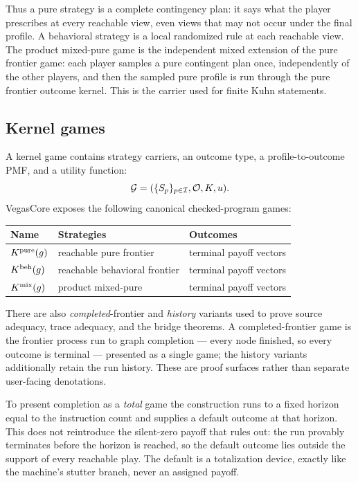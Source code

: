 Thus a pure strategy is a complete contingency plan: it says what the
player prescribes at every reachable view, even views that may not occur
under the final profile.  A behavioral strategy is a local randomized
rule at each reachable view.  The product mixed-pure game is the
independent mixed extension of the pure frontier game: each player
samples a pure contingent plan once, independently of the other players,
and then the sampled pure profile is run through the pure frontier
outcome kernel.  This is the carrier used for finite Kuhn statements.

\subsection{Kernel games}
\label{sec:fosg-kernel-games}

A kernel game contains strategy carriers, an outcome type, a
profile-to-outcome PMF, and a utility function:
\[
  \mathcal{G} = (\{S_p\}_{p\in\mathcal{I}}, \mathcal{O}, K, u).
\]
VegasCore exposes the following canonical checked-program games:
\begin{center}
\small
\begin{tabular}{@{}lll@{}}
\toprule
Name & Strategies & Outcomes \\
\midrule
\(K^{\mathrm{pure}}(g)\) & reachable pure frontier & terminal payoff vectors \\
\(K^{\mathrm{beh}}(g)\) & reachable behavioral frontier & terminal payoff vectors \\
\(K^{\mathrm{mix}}(g)\) & product mixed-pure & terminal payoff vectors \\
\bottomrule
\end{tabular}
\end{center}

There are also \emph{completed}-frontier and \emph{history} variants used to
prove source adequacy, trace adequacy, and the bridge theorems.  A
completed-frontier game is the frontier process run to graph completion ---
every node finished, so every outcome is terminal --- presented as a single
game; the history variants additionally retain the run history.  These are
proof surfaces rather than separate user-facing denotations.

To present completion as a \emph{total} game the construction runs to a fixed
horizon equal to the instruction count and supplies a default outcome at that
horizon.  This does not reintroduce the silent-zero payoff that
 rules out: the run provably terminates before the horizon
is reached, so the default outcome lies outside the support of every reachable
play.  The default is a totalization device, exactly like the machine's stutter
branch, never an assigned payoff.

